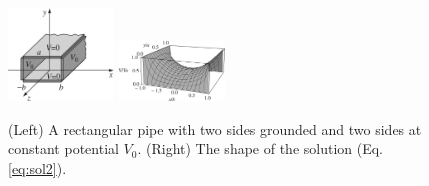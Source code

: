 \documentclass[12pt]{article}
\begin{document}
\begin{figure}
\centering
\includegraphics[width=0.25\textwidth]{figures/3_20.jpg} \hspace{1cm}
\includegraphics[width=0.25\textwidth]{figures/3_21.jpg}
\caption{\label{fig:pipe} (Left) A rectangular pipe with two sides grounded and two sides at constant potential $V_0$. (Right) The shape of the solution (Eq. \ref{eq:sol2}).}
\end{figure}
\end{document}
